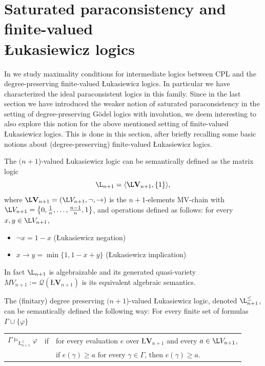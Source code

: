 \documentclass{article}
\theoremstyle{definition}
\newcommand{\algLfin}{\textbf{\L}\mathbf{V}}
\newcommand{\domLfin}{{\L}V}
\begin{document}
\section{Saturated paraconsistency and finite-valued\\ {\L}ukasiewicz logics} \label{sect-luka}

In \cite{CoEsGiGo} we
study maximality conditions for intermediate logics between CPL and the degree-preserving finite-valued {\L}ukasiewicz logics. In particular we have characterized the ideal paraconsistent logics in this family. Since in the last section we have introduced the weaker notion of saturated paraconsistency in the setting of degree-preserving G\"odel logics with involution, we deem interesting to also explore this notion for the above mentioned setting of finite-valued {\L}ukasiewicz logics. This is done in this section, after briefly recalling some basic notions about (degree-preserving) finite-valued {\L}ukasiewicz logics.


The $(n+1$)-valued {\L}ukasiewicz logic can be semantically defined as the matrix logic
$$\L_{n+1}=\langle \algLfin_{n+1}, \{1\}  \rangle, $$
where {$\algLfin_{n+1} = (\domLfin_{n+1}, \neg, \to)$} is the $n+1$-elements MV-chain   with $\domLfin_{n+1} = \big\{0,\frac{1}{n},\dots,\frac{n-1}{n},1\big\}$, and operations  defined as follows: for every $x,y \in \domLfin_{n+1}$,
\begin{itemize}
\item[] $\neg x =1-x$ ({\L}ukasiewicz negation)
\item[] $x \to y = \min \{1, 1-x+y\}$ ({\L}ukasiewicz implication)
\end{itemize}
%
In fact $\L_{n+1}$ is algebraizable and its generated quasi-variety $MV_{n+1}:=\mathcal{Q}(\algLfin_{n+1})$ is its equivalent algebraic semantics.

The (finitary) degree preserving $(n+1$)-valued {\L}ukasiewicz logic, denoted $\L_{n+1}^{\leq}$, can be semantically defined the following way: For every finite set of formulas $\Gamma\cup\{\varphi\}$\\

\begin{tabular}{lll}
$\Gamma\models_{\textrm{\L}_{n+1}^{\leq}} \varphi$ & if & for every evaluation $e$ over $\algLfin_{n+1}$ and every $a\in \domLfin_{n+1}$,\\
&&  if $e(\gamma)\geq a$ for every $\gamma\in \Gamma$, then $e(\gamma)\geq a$.\\
\end{tabular}
\mbox{} \\
\end{document}
